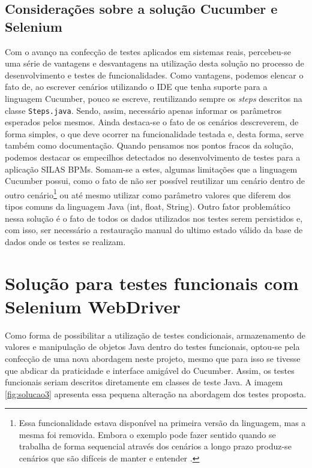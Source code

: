 \documentclass[tg]{mdtufsm}
\begin{document}
\subsection{Considerações sobre a solução Cucumber e Selenium}
Com o avanço na confecção de testes aplicados em sistemas reais, percebeu-se uma série de vantagens e desvantagens na utilização desta solução no processo de desenvolvimento e testes de funcionalidades.
Como vantagens, podemos elencar o fato de, ao escrever cenários utilizando o IDE que tenha suporte para a linguagem Cucumber, pouco se escreve, reutilizando sempre os \emph{steps} descritos na classe \texttt{Steps.java}. Sendo, assim, necessário apenas informar os parâmetros esperados pelos mesmos. Ainda destaca-se o fato de os cenários descreverem, de forma simples, o que deve ocorrer na funcionalidade testada e, desta forma, serve também como documentação.
Quando pensamos nos pontos fracos da solução, podemos destacar os empecilhos detectados no desenvolvimento de testes para a aplicação SILAS BPMs. Somam-se a estes, algumas limitações que a linguagem Cucumber possui, como o fato de não ser possível reutilizar um cenário dentro de outro cenário\footnote{Essa funcionalidade estava disponível na primeira versão da linguagem, mas a mesma foi removida. Embora o exemplo pode fazer sentido quando se trabalha de forma sequencial através dos cenários a longo prazo produz-se cenários que são difíceis de manter e entender \cite{givenscenario}. } ou até mesmo utilizar como parâmetro valores que diferem dos tipos comuns da linguagem Java (int, float, String). Outro fator problemático nessa solução é o fato de todos os dados utilizados nos testes serem persistidos e, com isso, ser necessário a restauração manual do ultimo estado válido da base de dados onde os testes se realizam.

\section{Solução para testes funcionais com Selenium WebDriver}
Como forma de possibilitar a utilização de testes condicionais, armazenamento de valores e manipulação de objetos Java dentro do testes funcionais, optou-se pela confecção de uma nova abordagem neste projeto, mesmo que para isso se tivesse que abdicar da praticidade e interface amigável do Cucumber. Assim, os testes funcionais seriam descritos diretamente em classes de teste Java. A imagem \ref{fig:solucao3} apresenta essa pequena alteração na abordagem dos testes proposta. 
\end{document}
